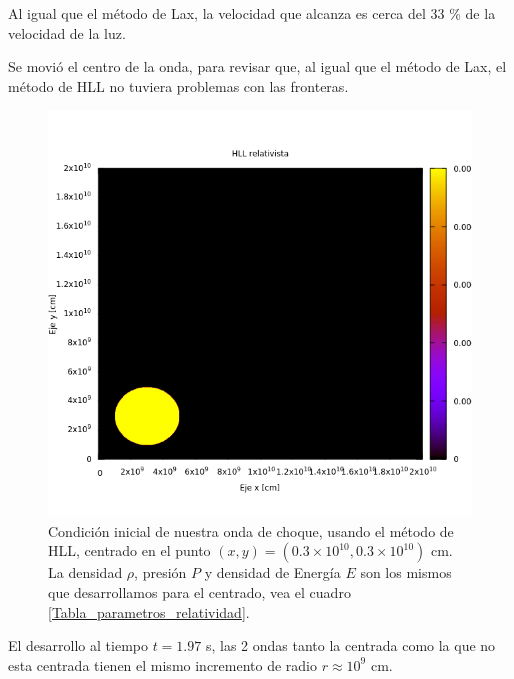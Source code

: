 \documentclass[12pt,a4paper]{book}
\begin{document}
Al igual que el método de Lax, la velocidad que alcanza es cerca del 33 \% de la velocidad de la luz.

Se movió el centro de la onda, para revisar que, al igual que el método de Lax, el método de HLL no tuviera problemas con las fronteras.

\begin{figure}[H]
\centering
\includegraphics[scale=0.5]{./Figuras/Pruebas/Prueba_onda_choque/Lax-HLL-rel/bwhll-rel0-no-centrado}
\caption{Condición inicial de nuestra onda de choque, usando el método de HLL, centrado en el punto $(x,y) = (0.3 \times 10^{10}, 0.3 \times 10^{10})$ cm. La densidad $\rho$, presión $P$ y densidad de Energía $E$ son los mismos que desarrollamos para el centrado, vea el cuadro \ref{Tabla_parametros_relatividad}.} \label{fig:bwhll-rel-no-centrado}
\end{figure}

El desarrollo al tiempo $t = 1.97$ s, las 2 ondas tanto la centrada como la que no esta centrada tienen el mismo incremento de radio $r \approx 10^{9}$ cm.
\end{document}
